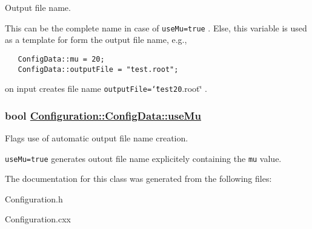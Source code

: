 Output file name. 

This can be the complete name in case of {\tt use\-Mu=true} . Else, this variable is used as a template for form the output file name, e.g., 

\begin{Code}\begin{verbatim}   ConfigData::mu = 20;
   ConfigData::outputFile = "test.root";  
\end{verbatim}\end{Code}

 on input creates file name {\tt output\-File=\char`\"{}test20}.root\char`\"{} . \hypertarget{classConfiguration_1_1ConfigData_7428762deac046b18b0fdf5abd895696}{
\subsubsection[useMu]{\setlength{\rightskip}{0pt plus 5cm}bool \hyperlink{classConfiguration_1_1ConfigData_7428762deac046b18b0fdf5abd895696}{Configuration::Config\-Data::use\-Mu}}}
\label{classConfiguration_1_1ConfigData_7428762deac046b18b0fdf5abd895696}


Flags use of automatic output file name creation. 

{\tt use\-Mu=true} generates outout file name explicitely containing the {\tt mu} value. 

The documentation for this class was generated from the following files:\begin{CompactItemize}
\item 
Configuration.h\item 
Configuration.cxx\end{CompactItemize}
